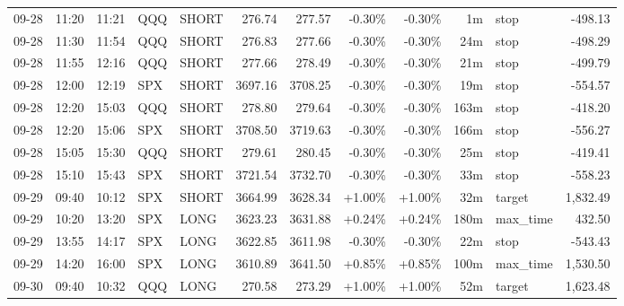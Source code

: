 \documentclass[11pt,a4paper,twoside]{article}
\begin{document}
\begin{center}
\begin{longtable}{>{\color{txtmain}}l l l l l r r r r r >{\color{txtmain}}l r}
09-28 & 11:20 & 11:21 & QQQ & SHORT & 276.74 & 277.57 & \textcolor{lossred}{-0.30\%} & \textcolor{lossred}{-0.30\%} & 1m & stop & \textcolor{lossred}{-498.13} \\
09-28 & 11:30 & 11:54 & QQQ & SHORT & 276.83 & 277.66 & \textcolor{lossred}{-0.30\%} & \textcolor{lossred}{-0.30\%} & 24m & stop & \textcolor{lossred}{-498.29} \\
09-28 & 11:55 & 12:16 & QQQ & SHORT & 277.66 & 278.49 & \textcolor{lossred}{-0.30\%} & \textcolor{lossred}{-0.30\%} & 21m & stop & \textcolor{lossred}{-499.79} \\
09-28 & 12:00 & 12:19 & SPX & SHORT & 3697.16 & 3708.25 & \textcolor{lossred}{-0.30\%} & \textcolor{lossred}{-0.30\%} & 19m & stop & \textcolor{lossred}{-554.57} \\
09-28 & 12:20 & 15:03 & QQQ & SHORT & 278.80 & 279.64 & \textcolor{lossred}{-0.30\%} & \textcolor{lossred}{-0.30\%} & 163m & stop & \textcolor{lossred}{-418.20} \\
09-28 & 12:20 & 15:06 & SPX & SHORT & 3708.50 & 3719.63 & \textcolor{lossred}{-0.30\%} & \textcolor{lossred}{-0.30\%} & 166m & stop & \textcolor{lossred}{-556.27} \\
09-28 & 15:05 & 15:30 & QQQ & SHORT & 279.61 & 280.45 & \textcolor{lossred}{-0.30\%} & \textcolor{lossred}{-0.30\%} & 25m & stop & \textcolor{lossred}{-419.41} \\
09-28 & 15:10 & 15:43 & SPX & SHORT & 3721.54 & 3732.70 & \textcolor{lossred}{-0.30\%} & \textcolor{lossred}{-0.30\%} & 33m & stop & \textcolor{lossred}{-558.23} \\
09-29 & 09:40 & 10:12 & SPX & SHORT & 3664.99 & 3628.34 & \textcolor{wingreen}{+1.00\%} & \textcolor{wingreen}{+1.00\%} & 32m & target & \textcolor{wingreen}{1,832.49} \\
09-29 & 10:20 & 13:20 & SPX & LONG & 3623.23 & 3631.88 & \textcolor{wingreen}{+0.24\%} & \textcolor{wingreen}{+0.24\%} & 180m & max\_time & \textcolor{wingreen}{432.50} \\
09-29 & 13:55 & 14:17 & SPX & LONG & 3622.85 & 3611.98 & \textcolor{lossred}{-0.30\%} & \textcolor{lossred}{-0.30\%} & 22m & stop & \textcolor{lossred}{-543.43} \\
09-29 & 14:20 & 16:00 & SPX & LONG & 3610.89 & 3641.50 & \textcolor{wingreen}{+0.85\%} & \textcolor{wingreen}{+0.85\%} & 100m & max\_time & \textcolor{wingreen}{1,530.50} \\
09-30 & 09:40 & 10:32 & QQQ & LONG & 270.58 & 273.29 & \textcolor{wingreen}{+1.00\%} & \textcolor{wingreen}{+1.00\%} & 52m & target & \textcolor{wingreen}{1,623.48} \\

\end{longtable}
\end{center}
\end{document}
